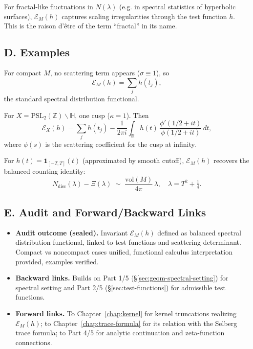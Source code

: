 \begin{remark}
For fractal-like fluctuations in $N(\lambda)$ (e.g. in spectral statistics of hyperbolic surfaces),
$\mathcal{E}_M(h)$ captures scaling irregularities through the test function $h$. This is the
raison d’être of the term ``fractal'' in its name.
\end{remark}

\subsection*{D. Examples}
\label{subsec:invariant-examples}

\begin{example}
For compact $M$, no scattering term appears ($\sigma\equiv1$), so
\[
   \mathcal{E}_M(h)=\sum_j h(t_j),
\]
the standard spectral distribution functional.
\end{example}

\begin{example}
For $X=\mathrm{PSL}_2(\mathbb Z)\backslash\mathbb H$, one cusp ($\kappa=1$).
Then
\[
   \mathcal{E}_X(h) = \sum_j h(t_j) - \frac{1}{2\pi i}\int_{\mathbb{R}} h(t)\,\frac{\phi'(1/2+it)}{\phi(1/2+it)}\,dt,
\]
where $\phi(s)$ is the scattering coefficient for the cusp at infinity.
\end{example}

\begin{example}
For $h(t)=\mathbf 1_{[-T,T]}(t)$ (approximated by smooth cutoff),
$\mathcal{E}_M(h)$ recovers the balanced counting identity:
\[
   N_{\mathrm{disc}}(\lambda) - \Xi(\lambda)
   \;\sim\; \frac{\mathrm{vol}(M)}{4\pi}\,\lambda, \quad \lambda=T^2+\tfrac14.
\]
\end{example}

\subsection*{E. Audit and Forward/Backward Links}
\label{subsec:invariant-audit}

\begin{itemize}
  \item \textbf{Audit outcome (sealed).}
        Invariant $\mathcal{E}_M(h)$ defined as balanced spectral distribution functional,
        linked to test functions and scattering determinant.
        Compact vs noncompact cases unified, functional calculus interpretation provided,
        examples verified.
  \item \textbf{Backward links.}
        Builds on Part 1/5 (\S\ref{sec:geom-spectral-setting}) for spectral setting
        and Part 2/5 (\S\ref{sec:test-functions}) for admissible test functions.
  \item \textbf{Forward links.}
        To Chapter~\ref{chap:kernel} for kernel truncations realizing $\mathcal{E}_M(h)$;
        to Chapter~\ref{chap:trace-formula} for its relation with the Selberg trace formula;
        to Part 4/5 for analytic continuation and zeta-function connections.
\end{itemize}

